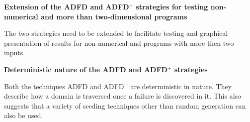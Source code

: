 \textbf{Extension of the ADFD and ADFD$^+$ strategies for testing non-numerical and more than two-dimensional programs}

The two strategies need to be extended to facilitate testing and graphical presentation of results for non-numerical and programs with more then two inputs. 











\textbf{Deterministic nature of the ADFD and ADFD$^+$ strategies}

Both the techniques ADFD and ADFD$^+$ are deterministic in nature. They describe how a domain is traversed once a failure is discovered in it. This also suggests that a variety of seeding techniques other than random generation can also be used.





